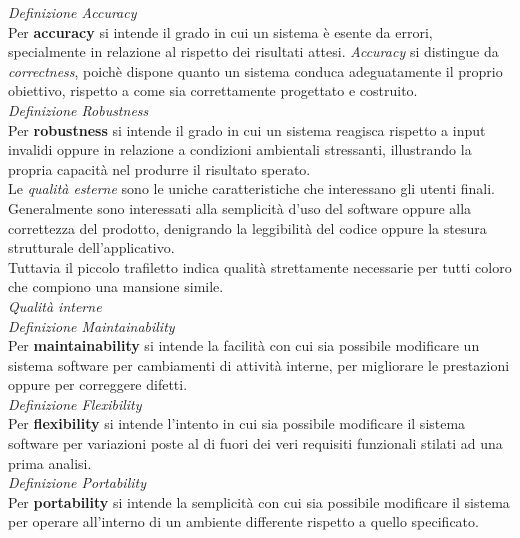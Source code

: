 \documentclass{article}
\begin{document}
\textit{Definizione Accuracy}\\
Per \textbf{accuracy} si intende il grado in cui un sistema è esente da errori, specialmente in relazione al rispetto dei risultati attesi. \textit{Accuracy} si distingue da \textit{correctness}, poichè dispone quanto un sistema conduca adeguatamente il proprio obiettivo, rispetto a come sia correttamente progettato e costruito.\vspace*{14pt}\\
\textit{Definizione Robustness}\\
Per \textbf{robustness} si intende il grado in cui un sistema reagisca rispetto a input invalidi oppure in relazione a condizioni ambientali stressanti, illustrando la propria capacità nel produrre il risultato sperato.\vspace*{14pt}\\
Le \textit{qualità esterne} sono le uniche caratteristiche che interessano gli utenti finali. Generalmente sono interessati alla semplicità d'uso del software oppure alla correttezza del prodotto, denigrando la leggibilità del codice oppure la stesura strutturale dell'applicativo.\vspace*{14pt}\\
Tuttavia il piccolo trafiletto indica qualità strettamente necessarie per tutti coloro che compiono una mansione simile.\vspace*{14pt}\\
\textit{Qualità interne}\\
\textit{Definizione Maintainability}\\
Per \textbf{maintainability} si intende la facilità con cui sia possibile modificare un sistema software per cambiamenti di attività interne, per migliorare le prestazioni oppure per correggere difetti.\vspace*{14pt}\\
\textit{Definizione Flexibility}\\
Per \textbf{flexibility} si intende l'intento in cui sia possibile modificare il sistema software per variazioni poste al di fuori dei veri requisiti funzionali stilati ad una prima analisi.\vspace*{14pt}\\
\textit{Definizione Portability}\\
Per \textbf{portability} si intende la semplicità con cui sia possibile modificare il sistema per operare all'interno di un ambiente differente rispetto a quello specificato.\vspace*{14pt}\\
\end{document}
